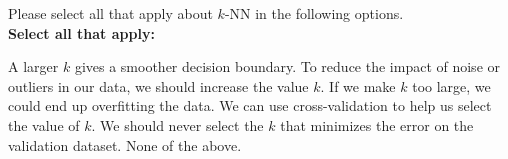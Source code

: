 \documentclass[11pt,addpoints,answers]{exam}
\numberwithin{equation}{section} %
\numberwithin{figure}{section} %
\numberwithin{table}{section} %
\begin{document}
\begin{questions}
    

    \question[3] Please select all that apply about $k$-NN in the following options. \\ \textbf{Select all that apply:}
    {
    \checkboxchar{$\Box$} \checkedchar{$\blacksquare$}
    \begin{checkboxes}
        \CorrectChoice A larger $k$ gives a smoother decision boundary.
        \choice To reduce the impact of noise or outliers in our data, we should increase the value $k$.
        \choice If we make $k$ too large, we could end up overfitting the data.
        \CorrectChoice We can use cross-validation to help us select the value of $k$.
        \choice We should never select the $k$ that minimizes the error on the validation dataset.
        \choice None of the above.
    \end{checkboxes}
    }

    
    
    \clearpage
\end{questions}
\end{document}
